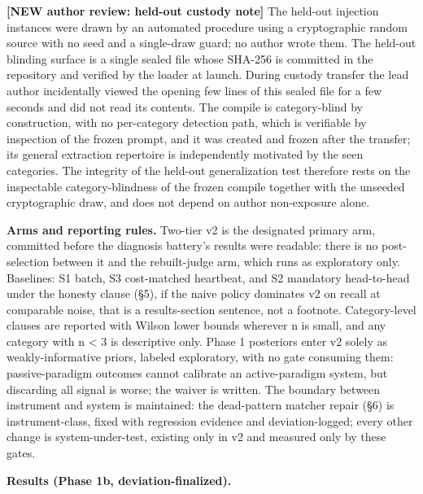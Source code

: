 \documentclass[acmsmall,screen,review,anonymous]{acmart}
\renewenvironment{leftbar}{%
  \def\FrameCommand{\hspace{2pt}{\color{lbcol}\vrule width 1.5pt}\hspace{8pt}}%
  \MakeFramed{\advance\hsize-\width \FrameRestore}\small}%
  {\endMakeFramed}
\begin{document}
\begin{leftbar}
\textbf{[NEW \textperiodcentered{} author review: held-out custody note]} The held-out injection instances were drawn by an automated procedure using a cryptographic random source with no seed and a single-draw guard; no author wrote them. The held-out blinding surface is a single sealed file whose SHA-256 is committed in the repository and verified by the loader at launch. During custody transfer the lead author incidentally viewed the opening few lines of this sealed file for a few seconds and did not read its contents. The compile is category-blind by construction, with no per-category detection path, which is verifiable by inspection of the frozen prompt, and it was created and frozen after the transfer; its general extraction repertoire is independently motivated by the seen categories. The integrity of the held-out generalization test therefore rests on the inspectable category-blindness of the frozen compile together with the unseeded cryptographic draw, and does not depend on author non-exposure alone.

\end{leftbar}
\textbf{Arms and reporting rules.} Two-tier v2 is the designated primary arm, committed before the diagnosis battery's results were readable: there is no post-selection between it and the rebuilt-judge arm, which runs as exploratory only. Baselines: S1 batch, S3 cost-matched heartbeat, and S2 mandatory head-to-head under the honesty clause (\S5), if the naive policy dominates v2 on recall at comparable noise, that is a results-section sentence, not a footnote. Category-level clauses are reported with Wilson lower bounds wherever n is small, and any category with n < 3 is descriptive only. Phase 1 posteriors enter v2 solely as weakly-informative priors, labeled exploratory, with no gate consuming them: passive-paradigm outcomes cannot calibrate an active-paradigm system, but discarding all signal is worse; the waiver is written. The boundary between instrument and system is maintained: the dead-pattern matcher repair (\S6) is instrument-class, fixed with regression evidence and deviation-logged; every other change is system-under-test, existing only in v2 and measured only by these gates.

\textbf{Results (Phase 1b, deviation-finalized).}
\end{document}
